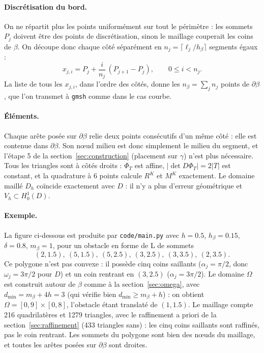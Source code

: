 \documentclass[11pt,a4paper]{article}
\begin{document}
\paragraph{Discrétisation du bord.} On ne répartit plus les points
uniformément sur tout le périmètre : les sommets $P_j$ doivent être des
points de discrétisation, sinon le maillage \og couperait \fg{} les coins de
$\beta$. On découpe donc chaque côté séparément en
$n_j = \lceil \ell_j / h_\beta \rceil$ segments égaux :
\[
x_{j,i} = P_j + \frac{i}{n_j}\,(P_{j+1} - P_j),
\qquad 0 \le i < n_j .
\]
La liste de tous les $x_{j,i}$, dans l'ordre des côtés, donne les
$n_\beta = \sum_j n_j$ points de $\partial\beta$, que l'on transmet à
\texttt{gmsh} comme dans le cas courbe.

\paragraph{Éléments.} Chaque arête posée sur $\partial\beta$ relie deux
points consécutifs d'un même côté : elle est contenue dans $\partial\beta$.
Son nœud milieu est donc simplement le milieu du segment, et l'étape 5 de la
section~\ref{sec:construction} (placement sur $\gamma$) n'est plus
nécessaire. Tous les triangles sont à côtés droits : $\Phi_T$ est affine,
$|\det D\Phi_T| = 2|T|$ est constant, et la quadrature à 6 points calcule
$R^K$ et $M^K$ exactement. Le domaine maillé $D_h$ coïncide exactement avec
$D$ : il n'y a plus d'erreur géométrique et $V_h \subset H^1_0(D)$.

\paragraph{Exemple.} La figure ci-dessous est produite par
\texttt{code/main.py} avec $h = 0.5$, $h_\beta = 0.15$, $\delta = 0.8$,
$m_\beta = 1$, pour un obstacle en forme de L de sommets
\[
(2, 1.5),\ (5, 1.5),\ (5, 2.5),\ (3, 2.5),\ (3, 3.5),\ (2, 3.5).
\]
Ce polygone n'est pas convexe : il possède cinq coins saillants
($\alpha_j = \pi/2$, donc $\omega_j = 3\pi/2$ pour $D$) et un coin rentrant
en $(3, 2.5)$ ($\alpha_j = 3\pi/2$). Le domaine $\Omega$ est construit
autour de $\beta$ comme à la section~\ref{sec:omega}, avec
$d_{\min} = m_\beta + 4h = 3$ (qui vérifie bien $d_{\min} \ge m_\beta + h$) :
on obtient $\Omega = [0,9] \times [0,8]$, l'obstacle étant translaté de
$(1, 1.5)$. Le maillage compte 216 quadrilatères et 1279 triangles, avec le
raffinement a priori de la section~\ref{sec:raffinement} (433 triangles
sans) : les cinq coins saillants sont raffinés, pas le coin rentrant. Les
sommets du polygone sont bien des nœuds du maillage, et toutes les arêtes
posées sur $\partial\beta$ sont droites.
\end{document}
